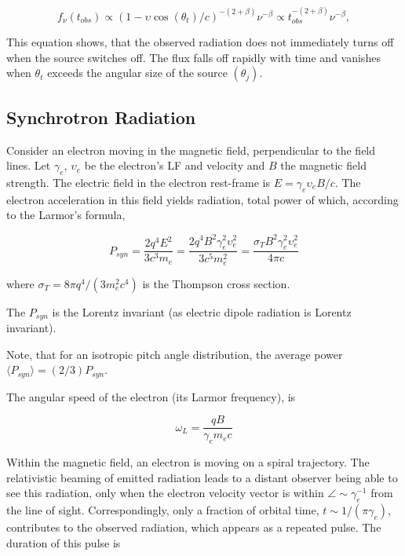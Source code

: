 \begin{equation}
f_{\nu}(t_{obs}) \propto (1 - \upsilon\cos(\theta_t)/c)^{-(2 + \beta)}\nu^{-\beta} \propto t_{obs}^{-(2+\beta)} \nu^{-\beta},
\end{equation}

This equation shows, that the observed radiation does not immediately turns off when the source switches off. The flux falls off rapidly with time and vanishes when $\theta_t$ exceeds the angular size of the source $(\theta_j)$.


\subsection{Synchrotron Radiation}


Consider an electron moving in the magnetic field, perpendicular to the field lines.
Let $\gamma_e$, $\upsilon_e$ be the electron's \ac{LF} and velocity and $B$ the magnetic field strength.
The electric field in the electron rest-frame is $E=\gamma_e \upsilon_e B /c$. The electron acceleration in this field yields radiation, total power of which, according to the Larmor's formula, 

\begin{equation}
P_{syn} = \frac{2q^4E^2}{3c^3m_e}=\frac{2q^4B^2\gamma_e^2\upsilon_e^2}{3c^5m_e^2}=\frac{\sigma_TB^2\gamma_e^2\upsilon_e^2}{4\pi c}
\end{equation}

where $\sigma_T = 8\pi q^4 / (3m_e^2c^4)$ is the Thompson cross section. 

The $P_{syn}$ is the Lorentz invariant (as electric dipole radiation is Lorentz invariant).

Note, that for an isotropic pitch angle distribution, the average power $\langle P_{syn} \rangle = (2/3)P_{syn}$.

The angular speed of the electron (\eg its Larmor frequency), is

\begin{equation}
\omega_L = \frac{q B}{\gamma_e m_e c}
\end{equation}

Within the magnetic field, an electron is moving on a spiral trajectory. 
The relativistic beaming of emitted radiation leads to a distant observer being able to see this radiation, only when the electron velocity vector is within $\angle \sim \gamma_e^{-1}$ from the line of sight. Correspondingly, only a fraction of orbital time, $t\sim1/(\pi\gamma_e)$, contributes to the observed radiation, which appears as a repeated pulse. 
The duration of this pulse is

